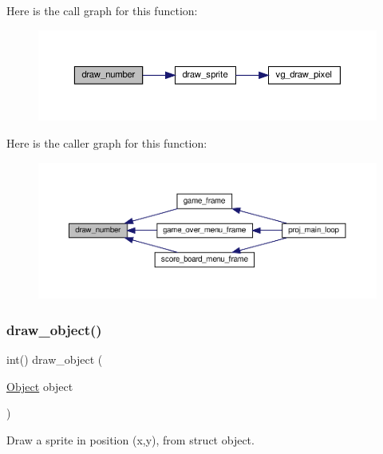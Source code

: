 Here is the call graph for this function\+:\nopagebreak
\begin{figure}[H]
\begin{center}
\leavevmode
\includegraphics[width=350pt]{group__graphics_ga7b24da519204bf650a1e98c993093e94_cgraph}
\end{center}
\end{figure}
Here is the caller graph for this function\+:\nopagebreak
\begin{figure}[H]
\begin{center}
\leavevmode
\includegraphics[width=350pt]{group__graphics_ga7b24da519204bf650a1e98c993093e94_icgraph}
\end{center}
\end{figure}
\mbox{\label{group__graphics_ga08b3cc962ee64800e139310f91a3d4b4}} 
\subsubsection{\texorpdfstring{draw\+\_\+object()}{draw\_object()}}
{\footnotesize\ttfamily int() draw\+\_\+object (\begin{DoxyParamCaption}\item[{\hyperlink{structObject}{Object}}]{object }\end{DoxyParamCaption})}



Draw a sprite in position (x,y), from struct object. 

